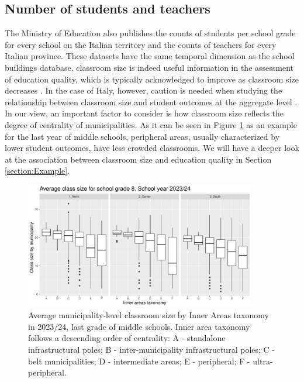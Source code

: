 \documentclass{book}
\begin{document}
\subsection{Number of students and teachers} \label{par:nstud}
The Ministry of Education also publishes the counts of students per school grade for every school on the Italian territory and the counts of teachers for every Italian province. These datasets have the same temporal dimension as the school buildings database. classroom size is indeed useful information in the assessment of education quality, which is typically acknowledged to improve as classroom size decreases \citep{Blatchford, Bruhwiler}. In the case of Italy, however, caution is needed when studying the relationship between classroom size and student outcomes at the aggregate level \citep{Angrist}. In our view, an important factor to consider is how classroom size reflects the degree of centrality of municipalities. As it can be seen in Figure \ref{fig:nstud_bp_8} as an example for the last year of middle schools, peripheral areas, usually characterized by lower student outcomes, have less crowded classrooms. We will have a deeper look at the association between classroom size and education quality in Section \ref{section:Example}.
\begin{figure}
  \centering
  \includegraphics[width = 0.9\textwidth]{SchoolDataIT/Fig4.pdf} 
  \caption{Average municipality-level classroom size by Inner Areas taxonomy in 2023/24, last grade of middle schools. Inner area taxonomy follows a descending order of centrality: A - standalone infrastructural poles; B - inter-municipality infrastructural poles; C - belt municipalities; D - intermediate areas; E - peripheral; F - ultra-peripheral.}
  \label{fig:nstud_bp_8}
\end{figure}
\end{document}
